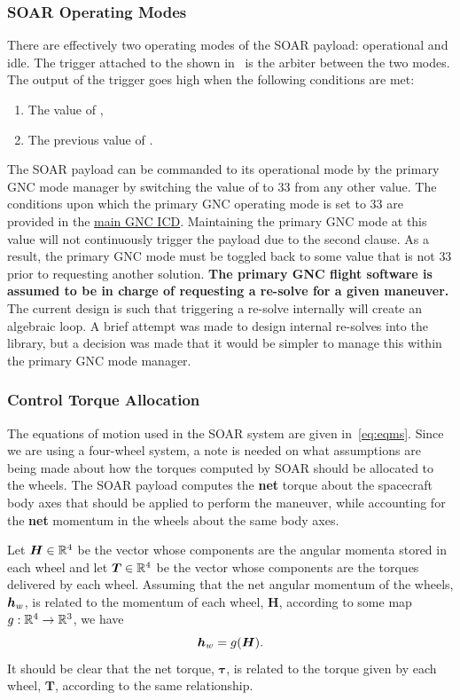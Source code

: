 \documentclass[10pt]{article}
\begin{document}
\subsubsection{SOAR Operating Modes}\label{sec3:op_modes}
There are effectively two operating modes of the SOAR payload: operational and idle. The trigger attached to the  shown in~ is the arbiter between the two modes. The output of the trigger goes high when the following conditions are met:
\begin{enumerate}
\item The value of ,
\item The previous value of .
\end{enumerate}
The SOAR payload can be commanded to its operational mode by the primary GNC mode manager by switching the value of  to $33$ from any other value. The conditions upon which the primary GNC operating mode is set to $33$ are provided in the \href{https://drive.google.com/open?id=1wTjmsQdXGk9jmEHy59fZAdBJJ3r1IE4LGFjHT2S5png}{main GNC ICD}. Maintaining the primary GNC mode at this value will not continuously trigger the payload due to the second clause. As a result, the primary GNC mode must be toggled back to some value that is not $33$ prior to requesting another solution. \textbf{The primary GNC flight software is assumed to be in charge of requesting a re-solve for a given maneuver.} The current design is such that triggering a re-solve internally will create an algebraic loop. A brief attempt was made to design internal re-solves into the library, but a decision was made that it would be simpler to manage this within the primary GNC mode manager. 

\subsubsection{Control Torque Allocation}\label{sec3:allocation}

The equations of motion used in the SOAR system are given in~\eqref{eq:eqms}. Since we are using a four-wheel system, a note is needed on what assumptions are being made about how the torques computed by SOAR should be allocated to the wheels. The SOAR payload computes the \textbf{net} torque about the spacecraft body axes that should be applied to perform the maneuver, while accounting for the \textbf{net} momentum in the wheels about the same body axes. 

Let $\bm{H}\in{\mathbb{R}}^4$ be the vector whose components are the angular momenta stored in each wheel and let $\bm{T}\in{\mathbb{R}}^4$ be the vector whose components are the torques delivered by each wheel. Assuming that the net angular momentum of the wheels, $\bm{h}_w$, is related to the momentum of each wheel, $\bm{H}$, according to some map $g : {\mathbb{R}}^4 \rightarrow {\mathbb{R}}^3$, we have
\begin{equation}
\bm{h}_w = g(\bm{H}).
\end{equation}
It should be clear that the net torque, $\bm{\tau}$, is related to the torque given by each wheel, $\bm{T}$, according to the same relationship. 
\end{document}
